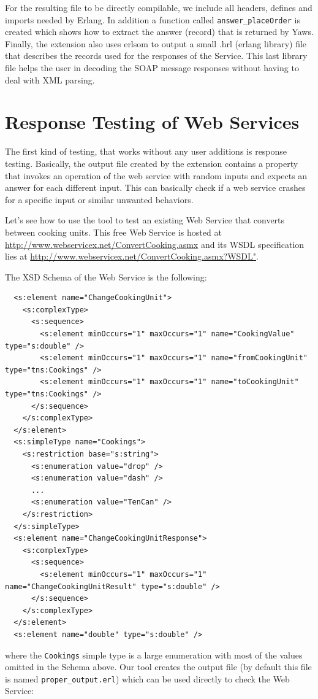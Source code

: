 \documentclass[submission,copyright,a4]{eptcs}
\begin{document}
For the resulting file to be directly compilable, we include all headers, defines and imports 
needed by Erlang. In addition a function called \texttt{answer\_placeOrder} is created which 
shows how to extract the answer (record) that is returned by Yaws. Finally, the extension also 
uses erlsom to output a small .hrl (erlang library) file that describes the records used for the 
responses of the Service. This last library file helps the user in decoding the SOAP message 
responses without having to deal with XML parsing.

\section{Response Testing of Web Services} \label{sec:response_testing}

The first kind of testing, that works without any user additions is response testing. Basically, 
the output file created by the extension contains a property that invokes an operation of the 
web service with random inputs and expects an answer for each different input. This can basically 
check if a web service crashes for a specific input or similar unwanted behaviors. 

Let's see how to use the tool to test an existing Web Service that
converts between cooking units. This free Web Service is hosted at
\url{http://www.webservicex.net/ConvertCooking.asmx} and its WSDL
specification lies at
\url{http://www.webservicex.net/ConvertCooking.asmx?WSDL"}.

The XSD Schema of the Web Service is the following:
\begin{lstlisting}
  <s:element name="ChangeCookingUnit">
    <s:complexType>
      <s:sequence>
        <s:element minOccurs="1" maxOccurs="1" name="CookingValue" type="s:double" />
        <s:element minOccurs="1" maxOccurs="1" name="fromCookingUnit" type="tns:Cookings" />
        <s:element minOccurs="1" maxOccurs="1" name="toCookingUnit" type="tns:Cookings" />
      </s:sequence>
    </s:complexType>
  </s:element>
  <s:simpleType name="Cookings">
    <s:restriction base="s:string">
      <s:enumeration value="drop" />
      <s:enumeration value="dash" />
      ...
      <s:enumeration value="TenCan" />
    </s:restriction>
  </s:simpleType>
  <s:element name="ChangeCookingUnitResponse">
    <s:complexType>
      <s:sequence>
        <s:element minOccurs="1" maxOccurs="1" name="ChangeCookingUnitResult" type="s:double" />
      </s:sequence>
    </s:complexType>
  </s:element>
  <s:element name="double" type="s:double" />
\end{lstlisting}
where the \texttt{Cookings} simple type is a large enumeration with
most of the values omitted in the Schema above. Our tool creates the
output file (by default this file is named
\texttt{proper\_output.erl}) which can be used directly to check the
Web Service:
\end{document}
